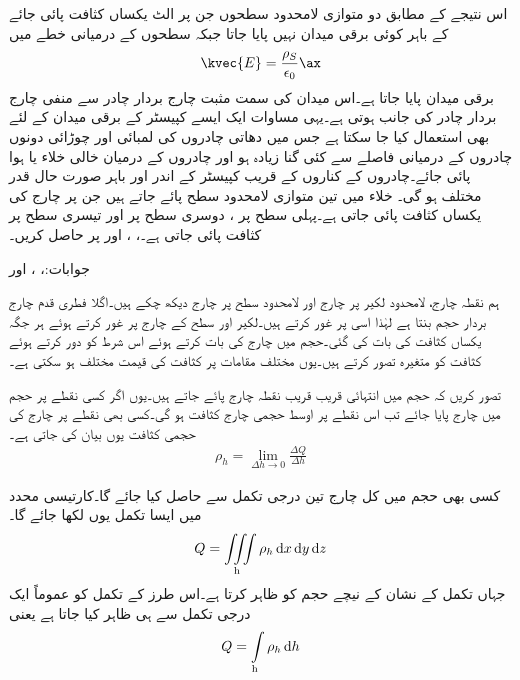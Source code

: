 اس نتیجے کے مطابق دو متوازی لامحدود سطحوں جن پر الٹ یکساں کثافت پائی جائے کے باہر کوئی برقی میدان نہیں پایا جاتا جبکہ سطحوں کے درمیانی خطے میں
\begin{align}\label{مساوات_کولمب_متوازی_چادر_کپیسٹر_کا_میدان}
\kvec{E}=\frac{\rho_S}{\epsilon_0}\ax
\end{align}
برقی میدان پایا جاتا ہے۔اس میدان کی سمت مثبت چارج بردار چادر سے منفی چارج بردار چادر کی جانب ہوتی ہے۔یہی مساوات ایک ایسے کپیسٹر کے برقی میدان کے لئے بھی استعمال کیا جا سکتا ہے  جس میں دھاتی چادروں  کی لمبائی اور چوڑائی دونوں چادروں کے درمیانی فاصلے سے کئی گنا زیادہ ہو اور چادروں کے درمیان خالی خلاء یا ہوا پائی جائے۔چادروں کے کناروں کے قریب کپیسٹر کے اندر اور باہر صورت حال قدر مختلف ہو گی۔ 
خلاء میں تین متوازی لامحدود سطح پائے جاتے ہیں جن پر چارج کی یکساں کثافت پائی جاتی ہے۔پہلی سطح  پر  ، دوسری سطح   پر   اور تیسری سطح  پر   کثافت پائی جاتی ہے۔، ، اور  پر  حاصل کریں۔

جوابات:، ،  اور  

ہم نقطہ چارج، لامحدود لکیر پر چارج اور لامحدود سطح پر چارج دیکھ چکے ہیں۔اگلا فطری قدم  چارج بردار حجم بنتا ہے لہٰذا اسی پر غور کرتے ہیں۔لکیر اور سطح کے چارج  پر غور کرتے ہوئے ہر جگہ یکساں کثافت کی بات کی گئی۔حجم میں چارج کی بات کرتے ہوئے اس شرط کو دور کرتے ہوئے کثافت کو متغیرہ تصور کرتے ہیں۔یوں مختلف مقامات پر کثافت کی قیمت مختلف ہو سکتی ہے۔

تصور کریں کہ حجم میں انتہائی قریب قریب نقطہ چارج پائے جاتے ہیں۔یوں اگر کسی نقطے پر  حجم میں  چارج پایا جائے تب اس نقطے پر اوسط حجمی چارج کثافت  ہو گی۔کسی بھی نقطے پر چارج کی حجمی  کثافت  یوں بیان کی جاتی ہے۔
\begin{align}
\rho_h=\lim_{\Delta h \to 0} \frac{\Delta Q}{\Delta h}
\end{align} 

کسی بھی حجم میں کل چارج   تین درجی تکمل سے حاصل کیا جائے گا۔کارتیسی محدد میں ایسا تکمل یوں لکھا جائے گا۔
\begin{align}
Q=\iiint\limits_{\textrm{h}} \rho_h \dif x \dif y \dif z
\end{align}
جہاں تکمل کے نشان کے نیچے  حجم کو ظاہر کرتا ہے۔اس طرز کے تکمل کو عموماً ایک درجی تکمل سے ہی ظاہر کیا جاتا ہے یعنی
\begin{align}
Q=\int\limits_{\textrm{h}} \rho_h \dif h
\end{align}


